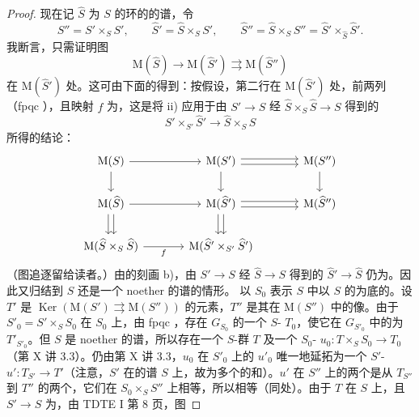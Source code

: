 \begin{proof}
现在记 $\widehat S$ 为 $S$ 的环的的谱，令
\[S''=S'\times_S S',\qquad \widehat S'=\widehat S\times_S S',\qquad \widehat S''=\widehat S\times_S S''=\widehat S'\times_{\widehat S}\widehat S'.\]
我断言，只需证明图
\[\mathrm M(\widehat S)\longrightarrow\mathrm M(\widehat S')\rightrightarrows\mathrm M(\widehat S'')\tag{*}\]
在 $\mathrm M(\widehat S')$ 处。这可由下面的得到：按假设，第二行在 $\mathrm M(\widehat S')$ 处，前两列（fpqc ），且映射 $f$ 为，这是将 ii) 应用于由 $S'\to S$ 经 $\widehat S\times_S\widehat S\to S$ 得到的
\[\widehat S'\times_{S'}\widehat S'\longrightarrow\widehat S\times_S\widehat S\]
所得的结论：
\[
\begin{tikzcd}[column sep=large]
\mathrm M(S)\arrow[r]\arrow[d]&\mathrm M(S')\arrow[r,shift left]\arrow[r,shift right]\arrow[d]&\mathrm M(S'')\arrow[d]\\
\mathrm M(\widehat S)\arrow[r]\arrow[d,shift left]\arrow[d,shift right]&\mathrm M(\widehat S')\arrow[r,shift left]\arrow[r,shift right]\arrow[d,shift left]\arrow[d,shift right]&\mathrm M(\widehat S'')\\
\mathrm M(\widehat S\times_S\widehat S)\arrow[r,"f"']&\mathrm M(\widehat S'\times_{S'}\widehat S')&
\end{tikzcd}
\]
（图追逐留给读者。）由的刻画 b)，由 $S'\to S$ 经 $\widehat S\to S$ 得到的 $\widehat S'\to\widehat S$ 仍为。因此又归结到 $S$ 还是一个 noether 的谱的情形。
以 $S_0$ 表示 $S$ 中以 $S$ 的为底的。设 $T'$ 是 $\operatorname{Ker}(\mathrm M(S')\rightrightarrows\mathrm M(S''))$ 的元素，$T''$ 是其在 $\mathrm M(S'')$ 中的像。由于 $S'_0=S'\times_S S_0$ 在 $S_0$ 上，由 fpqc ，存在 $G_{S_0}$ 的一个 $S$- $T_0$，使它在 $G_{S'_0}$ 中的为 $T'_{S'_0}$。但 $S$ 是 noether 的谱，所以存在一个 $S$-群 $T$ 及一个 $S_0$- $u_0:T\times_S S_0\to T_0$（第 X 讲 3.3）。仍由第 X 讲 3.3，$u_0$ 在 $S'_0$ 上的 $u'_0$ 唯一地延拓为一个 $S'$- $u':T_{S'}\to T'$（注意，$S'$ 在的谱 $S$ 上，故为多个的和）。$u'$ 在 $S''$ 上的两个是从 $T_{S''}$ 到 $T''$ 的两个，它们在 $S_0\times_S S''$ 上相等，所以相等（同处）。由于 $T$ 在 $S$ 上，且 $S'\to S$ 为，由 TDTE I 第 8 页，图

\end{proof}
